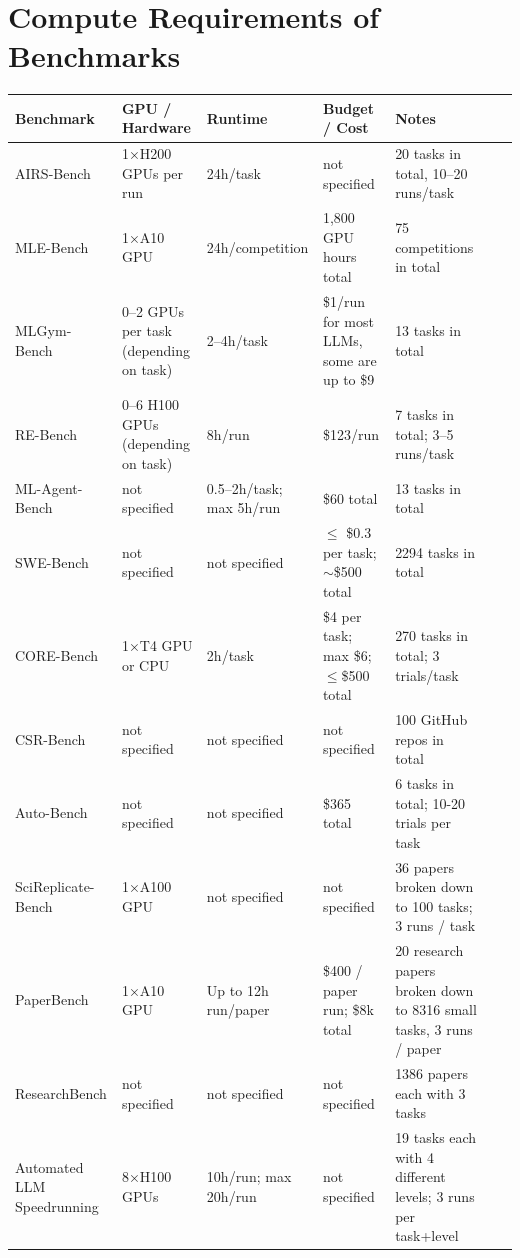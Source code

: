 \documentclass{fairmeta}
\begin{document}
\newpage
\section{Compute Requirements of Benchmarks}
\label{app:compute_reqs_benchmarks}
\renewcommand{\arraystretch}{1.2} %
\begin{table}[htbp]
\centering
\small
\label{tab:benchmark-compute-summary}
\begin{NiceTabular}{p{2.8cm}X X X X X X}
\toprule

\textbf{Benchmark} & \textbf{GPU / Hardware} & \textbf{Runtime} & \textbf{Budget / Cost}
& \textbf{Notes} \\
\midrule
AIRS-Bench & 1×H200 GPUs per run & 24h/task & not specified
& 20 tasks in total, 10--20 runs/task \\
MLE-Bench & 1×A10 GPU & 24h/competition & 1,800 GPU hours total
& 75 competitions in total \\
MLGym-Bench & 0--2 GPUs per task (depending on task) & 2--4h/task & \$1/run for most LLMs, some are up to \$9
& 13 tasks in total \\
RE-Bench & 0--6 H100 GPUs (depending on task) & 8h/run & \$123/run
& 7 tasks in total; 3--5 runs/task \\
ML-Agent-Bench & not specified & 0.5--2h/task; max 5h/run & \$60 total
& 13 tasks in total \\
SWE-Bench & not specified & not specified & $\leq$ \$0.3 per task; $\sim$\$500 total
& 2294 tasks in total \\
CORE-Bench & 1×T4 GPU or CPU & 2h/task & \$4 per task; max \$6; $\leq$\$500 total
& 270 tasks in total; 3 trials/task \\
CSR-Bench & not specified & not specified & not specified
& 100 GitHub repos in total \\
Auto-Bench & not specified & not specified & \$365 total
& 6 tasks in total; 10-20 trials per task \\
SciReplicate-Bench & 1×A100 GPU & not specified & not specified
& 36 papers broken down to 100 tasks; 3 runs / task \\
PaperBench & 1×A10 GPU & Up to 12h run/paper & \$400 / paper run; \$8k total
& 20 research papers broken down to 8316 small tasks, 3 runs / paper \\
ResearchBench & not specified & not specified & not specified
& 1386 papers each with 3 tasks \\
Automated LLM Speedrunning & 8×H100 GPUs & 10h/run; max 20h/run & not specified
& 19 tasks each with 4 different levels; 3 runs per task+level \\
\bottomrule


\end{NiceTabular}
\end{table}
\end{document}
